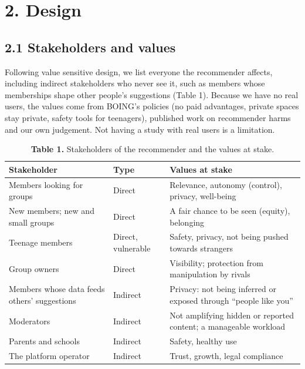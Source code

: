 \documentclass[11pt,letterpaper]{article}
\newcommand{\rowrule}{\midrule[0.2pt]}
\begin{document}
\section{2. Design}

\subsection{2.1 Stakeholders and values}

Following value sensitive design, we list everyone the recommender affects, including indirect stakeholders
who never see it, such as members whose memberships shape other people's suggestions (Table 1). Because we
have no real users, the values come from BOING's policies (no paid advantages, private spaces stay private,
safety tools for teenagers), published work on recommender harms and our own judgement. Not having a study
with real users is a limitation.

\begin{table}[!htbp]
\centering
\caption*{\textbf{Table 1.} Stakeholders of the recommender and the values at stake.}
\scriptsize
\begin{tabular}{
  >{\raggedright\arraybackslash}p{}
  >{\raggedright\arraybackslash}p{}
  >{\raggedright\arraybackslash}p{}
}
\toprule
\textbf{Stakeholder} & \textbf{Type} & \textbf{Values at stake} \\
\midrule
Members looking for groups & Direct & Relevance, autonomy (control), privacy, well-being \\
\rowrule
New members; new and small groups & Direct & A fair chance to be seen (equity), belonging \\
\rowrule
Teenage members & Direct, vulnerable & Safety, privacy, not being pushed towards strangers \\
\rowrule
Group owners & Direct & Visibility; protection from manipulation by rivals \\
\rowrule
Members whose data feeds others' suggestions & Indirect & Privacy: not being inferred or exposed through ``people like you'' \\
\rowrule
Moderators & Indirect & Not amplifying hidden or reported content; a manageable workload \\
\rowrule
Parents and schools & Indirect & Safety, healthy use \\
\rowrule
The platform operator & Indirect & Trust, growth, legal compliance \\
\bottomrule
\end{tabular}
\end{table}
\end{document}
